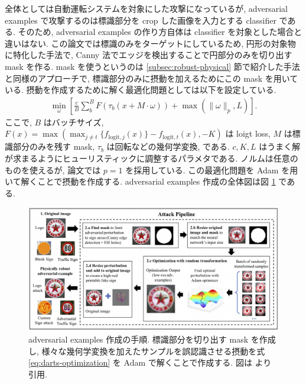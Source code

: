 全体としては自動運転システムを対象にした攻撃になっているが, adversarial examples で攻撃するのは標識部分を crop した画像を入力とする classifier である.
そのため, adversarial examples の作り方自体は classifier を対象とした場合と違いはない.
この論文では標識のみをターゲットにしているため, 円形の対象物に特化した手法で, Canny 法でエッジを検出することで円部分のみを切り出す mask を作る.
mask を使うというのは \ref{subsec:robust-physical} 節で紹介した手法と同様のアプローチで, 標識部分のみに摂動を加えるためにこの mask を用いている.
摂動を作成するために解く最適化問題としては以下を設定している.
%
\begin{eqnarray}
\min_{\omega} \left[ \frac{c}{B} \sum_b^B F(\tau_b (x + M \cdot \omega)) + \max (\| \omega \|_p, L) \right].
\label{eq:darts-optimization}
\end{eqnarray}
%
ここで, $B$ はバッチサイズ, $F(x) = \max ( \max_{j \neq t} \{f_{\text{logit}, j} (x)\} - f_{\text{logit}, t} (x), - K)$ は loigt loss, $M$ は標識部分のみを残す mask, $\tau_b$ は回転などの幾何学変換, である.
$c, K, L$ はうまく解が求まるようにヒューリスティックに調整するパラメタである.
ノルムは任意のものを使えるが, 論文では $p = 1$ を採用している.
この最適化問題を Adam \cite{kingma2014adam} を用いて解くことで摂動を作成する.
adversarial examples 作成の全体図は図 \ref{fig:darts-attack-pipeline} である.
%
\begin{figure}[htbp]
\begin{center}
\includegraphics[width=14.0cm]{figures/darts-attack-pipeline.pdf}
\end{center}
\caption{
adversarial examples 作成の手順.
標識部分を切り出す mask を作成し, 様々な幾何学変換を加えたサンプルを誤認識させる摂動を式 \ref{eq:darts-optimization} を Adam で解くことで作成する.
図は \cite{sitawarin2018darts} より引用.
}
\label{fig:darts-attack-pipeline}
\end{figure}
%

